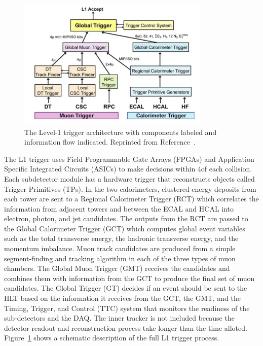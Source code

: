 \begin{figure}[htbp]
  \centering
  \includegraphics[width=0.8175\textwidth]{Detector/Figures/cms_l1t.png}
  \caption{
    The Level-1 trigger architecture with components labeled and information flow indicated.  
    Reprinted from Reference~\cite{CMS2008}.
  }
  \label{fig:cms_l1t}
\end{figure}

The L1 trigger uses Field Programmable Gate Arrays (FPGAs) and Application Specific Integrated Circuits (ASICs) to make decisions within 4\mus of each collision.
Each subdetector module has a hardware trigger that reconstructs objects called Trigger Primitives (TPs).
In the two calorimeters, clustered energy deposits from each tower are sent to a Regional Calorimeter Trigger (RCT) which correlates the information from adjacent towers and between the ECAL and HCAL into electron, photon, and jet candidates.
The outputs from the RCT are passed to the Global Calorimeter Trigger (GCT) which computes global event variables such as the total transverse energy, the hadronic transverse energy, and the momentum imbalance.
Muon track candidates are produced from a simple segment-finding and tracking algorithm in each of the three types of muon chambers.
The Global Muon Trigger (GMT) receives the candidates and combines them with information from the GCT to produce the final set of muon candidates.
The Global Trigger (GT) decides if an event should be sent to the HLT based on the information it receives from the GCT, the GMT, and the Timing, Trigger, and Control (TTC) system that monitors the readiness of the sub-detectors and the DAQ.
The inner tracker is not included because the detector readout and reconstruction process take longer than the time alloted.
Figure~\ref{fig:cms_l1t} shows a schematic description of the full L1 trigger process.

